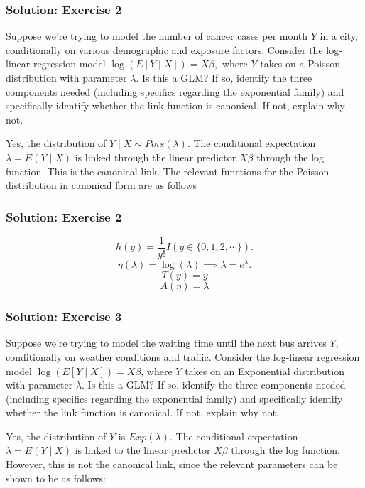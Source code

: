 \documentclass{beamer}
\begin{document}
\begin{frame}
\frametitle{Solution: Exercise 2}

Suppose we’re trying to model the number of cancer cases per month $Y$ in a city, conditionally on various demographic and exposure factors. Consider the log-linear regression model $\log (E[Y \mid X]) = X\beta,$ where $Y$ takes on a Poisson distribution with parameter  $\lambda.$ Is this a GLM? If so, identify the three components needed (including specifics regarding the exponential family) and specifically identify whether the link function is canonical. If not, explain why not.

\vspace*{1em}

Yes, the distribution of $Y \mid X \sim Pois(\lambda)$. The conditional expectation $\lambda = E(Y \mid X)$ is linked through the linear predictor $X\beta$ through the log function. This is the canonical link. The relevant functions for the Poisson distribution in canonical form are as follows



\end{frame}



\begin{frame}
\frametitle{Solution: Exercise 2}

$$h(y) = \frac{1}{y!} I(y \in \{0, 1, 2, \cdots \}).$$
$$\eta(\lambda) = \log(\lambda) \implies \lambda = e^{\lambda}.$$
$$T(y) = y $$
$$A(\eta) = \lambda $$
\end{frame}

\begin{frame}
\frametitle{Solution: Exercise 3}

Suppose we’re trying to model the waiting time until the next bus arrives $Y$, conditionally on weather conditions and traffic. Consider the log-linear regression model $\log (E[Y \mid X]) = X\beta$, where $Y$ takes on an Exponential distribution with parameter $\lambda$. Is this a GLM? If so, identify the three components needed (including specifics regarding the exponential family) and specifically identify whether the link function is canonical. If not, explain why not.

\vspace*{1em}

Yes, the distribution of $Y$ is $Exp(\lambda)$. The conditional expectation $\lambda = E(Y \mid X)$ is linked to the linear predictor $X \beta$ through the log function. However, this is not the canonical link, since the relevant parameters can be shown to be as follows:

\end{frame}
\end{document}
